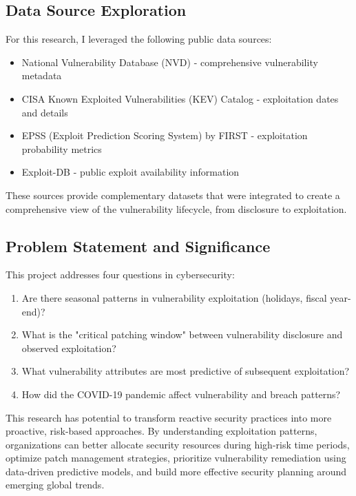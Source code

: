 \documentclass[runningheads]{llncs}
\begin{document}
\subsection{Data Source Exploration}
For this research, I leveraged the following public data sources:
\begin{itemize}
    \item National Vulnerability Database (NVD) \cite{nvd_nist} - comprehensive vulnerability metadata
    \item CISA Known Exploited Vulnerabilities (KEV) Catalog \cite{cisa_kev} - exploitation dates and details
    \item EPSS (Exploit Prediction Scoring System) by FIRST \cite{epss_first} - exploitation probability metrics
    \item Exploit-DB \cite{exploit_db} - public exploit availability information
\end{itemize}

These sources provide complementary datasets that were integrated to create a comprehensive view of the vulnerability lifecycle, from disclosure to exploitation.

\subsection{Problem Statement and Significance}
This project addresses four questions in cybersecurity:
\begin{enumerate}
    \item Are there seasonal patterns in vulnerability exploitation (holidays, fiscal year-end)?
    \item What is the "critical patching window" between vulnerability disclosure and observed exploitation?
    \item What vulnerability attributes are most predictive of subsequent exploitation?
    \item How did the COVID-19 pandemic affect vulnerability and breach patterns?
\end{enumerate}

This research has potential to transform reactive security practices into more proactive, risk-based approaches. By understanding exploitation patterns, organizations can better allocate security resources during high-risk time periods, optimize patch management strategies, prioritize vulnerability remediation using data-driven predictive models, and build more effective security planning around emerging global trends.
\end{document}
